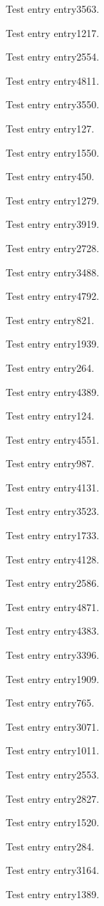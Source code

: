 Test entry \gls{entry3563}.

Test entry \gls{entry1217}.

Test entry \gls{entry2554}.

Test entry \gls{entry4811}.

Test entry \gls{entry3550}.

Test entry \gls{entry127}.

Test entry \gls{entry1550}.

Test entry \gls{entry450}.

Test entry \gls{entry1279}.

Test entry \gls{entry3919}.

Test entry \gls{entry2728}.

Test entry \gls{entry3488}.

Test entry \gls{entry4792}.

Test entry \gls{entry821}.

Test entry \gls{entry1939}.

Test entry \gls{entry264}.

Test entry \gls{entry4389}.

Test entry \gls{entry124}.

Test entry \gls{entry4551}.

Test entry \gls{entry987}.

Test entry \gls{entry4131}.

Test entry \gls{entry3523}.

Test entry \gls{entry1733}.

Test entry \gls{entry4128}.

Test entry \gls{entry2586}.

Test entry \gls{entry4871}.

Test entry \gls{entry4383}.

Test entry \gls{entry3396}.

Test entry \gls{entry1909}.

Test entry \gls{entry765}.

Test entry \gls{entry3071}.

Test entry \gls{entry1011}.

Test entry \gls{entry2553}.

Test entry \gls{entry2827}.

Test entry \gls{entry1520}.

Test entry \gls{entry284}.

Test entry \gls{entry3164}.

Test entry \gls{entry1389}.

